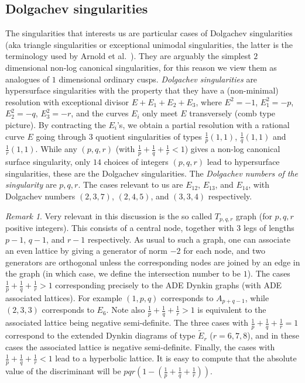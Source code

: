 \documentclass[11pt]{amsart}
\numberwithin{equation}{section}
\theoremstyle{plain}
\theoremstyle{remark}
\newtheorem{remark}[theorem]{Remark}
\theoremstyle{definition}
\begin{document}
\subsection{Dolgachev singularities} The  singularities that interests us are particular cases of Dolgachev singularities \cite{dolgachevs} (aka triangle singularities or exceptional unimodal singularities, the latter is the terminology used by Arnold et al.~\cite{arnold}).
They are arguably the simplest $2$ dimensional non-log canonical singularities, for this reason we view them as analogues of $1$ dimensional   ordinary cusps. {\it Dolgachev singularities} are hypersurface singularities with the property that they have a  (non-minimal) resolution with exceptional divisor $E+ E_1+ E_2+ E_3$, where $E^2=-1$, $E_1^2=-p$, $E_2^2=-q$, $E_3^2=-r$, and the curves $E_i$ only meet $E$ transversely (comb type picture).    By contracting the $E_i$'s, we obtain a partial resolution with a rational curve $E$ going through $3$ quotient singularities of types $\frac{1}{p}(1,1)$, 
 $\frac{1}{q}(1,1)$ and $\frac{1}{r}(1,1)$. While any $(p,q,r)$ (with $\frac{1}{p}+\frac{1}{q}+\frac{1}{r}<1$) gives a non-log canonical surface singularity, only  $14$ choices of integers $(p,q,r)$ lead to hypersurface singularities, these  are the Dolgachev singularities.  The \emph{Dolgachev numbers of the singularity} are 
 $p,q,r$. The cases relevant to us  are  $E_{12}$, $E_{13}$, and $E_{14}$, with Dolgachev numbers  $(2,3,7)$, $(2,4,5)$, and $(3,3,4)$ respectively.

\begin{remark}
%
Very relevant in this discussion is the so called $T_{p,q,r}$ graph (for $p,q,r$ positive integers). This consists of a central node, together with $3$ legs of lengths $p-1$, $q-1$, and $r-1$ respectively. As usual to such a graph, one can associate an even lattice by giving a generator of norm $-2$ for each node, and two generators are orthogonal unless the corresponding nodes are joined by an edge in the graph (in which case, we define the intersection number to be $1$). 
The cases $\frac{1}{p}+\frac{1}{q}+\frac{1}{r}>1$ corresponding precisely to the ADE Dynkin graphs (with ADE associated lattices). For example $(1,p,q)$ corresponds to $A_{p+q-1}$, while $(2,3,3)$ corresponds to $E_6$. Note also $\frac{1}{p}+\frac{1}{q}+\frac{1}{r}>1$ is equivalent to the associated lattice being negative semi-definite. The three cases with $\frac{1}{p}+\frac{1}{q}+\frac{1}{r}=1$ correspond to the extended Dynkin diagrams of type $\widetilde E_r$ ($r=6,7,8$), and in these cases the associated lattice is negative semi-definite. Finally, the cases with $\frac{1}{p}+\frac{1}{q}+\frac{1}{r}<1$ lead to a hyperbolic lattice. It is easy to compute that the absolute value of the discriminant will be $pqr\left(1-\left(\frac{1}{p}+\frac{1}{q}+\frac{1}{r}\right)\right)$. 
%
\end{remark}
\end{document}
